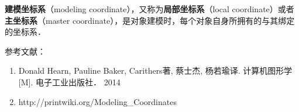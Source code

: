 
\textbf{建模坐标系}（modeling coordinate），又称为\textbf{局部坐标系}（local coordinate）或者\textbf{主坐标系}（master coordinate），是对象建模时，每个对象自身所拥有的与其绑定的坐标系．





参考文献：
\begin{enumerate}
\item Donald Hearn, Pauline Baker, Carithers著, 蔡士杰, 杨若瑜译. 计算机图形学[M]. 电子工业出版社． 2014
\item http://printwiki.org/Modeling\_Coordinates
\end{enumerate}